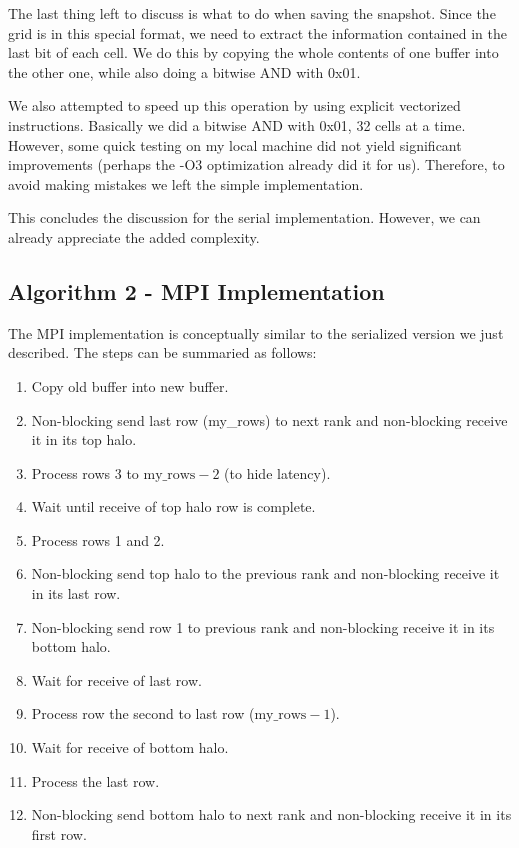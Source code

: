 \documentclass{report}
\begin{document}
The last thing left to discuss is what to do when saving the snapshot. Since 
the grid is in this special format, we need to extract the information contained 
in the last bit of each cell. We do this by copying the whole contents of one 
buffer into the other one, while also doing a bitwise AND with 0x01.

We also attempted to speed up this operation by using 
explicit vectorized instructions. Basically we did a bitwise AND with 0x01, 32 
cells at a time. However, some quick testing on my local machine did not yield 
significant improvements (perhaps the -O3 optimization already did it for us). 
Therefore, to avoid making mistakes we left the simple implementation.

This concludes the discussion for the serial implementation. However, we can 
already appreciate the added complexity.

\subsection{Algorithm 2 - MPI Implementation}

The MPI implementation is conceptually similar to the serialized version we just 
described. The steps can be summaried as follows:

\begin{enumerate}
    \item Copy old buffer into new buffer.
    \item Non-blocking send last row (my\_rows) to next rank and non-blocking receive it in its top halo.
    \item Process rows 3 to $\text{my\_rows} - 2$ (to hide latency).
    \item Wait until receive of top halo row is complete.
    \item Process rows 1 and 2.
    \item Non-blocking send top halo to the previous rank and non-blocking receive it in its last row.
    \item Non-blocking send row 1 to previous rank and non-blocking receive it in its bottom halo.
    \item Wait for receive of last row.
    \item Process row the second to last row ($\text{my\_rows} -1$).
    \item Wait for receive of bottom halo. 
    \item Process the last row.
    \item Non-blocking send bottom halo to next rank and non-blocking receive it in its first row. 
\end{enumerate}
\end{document}
